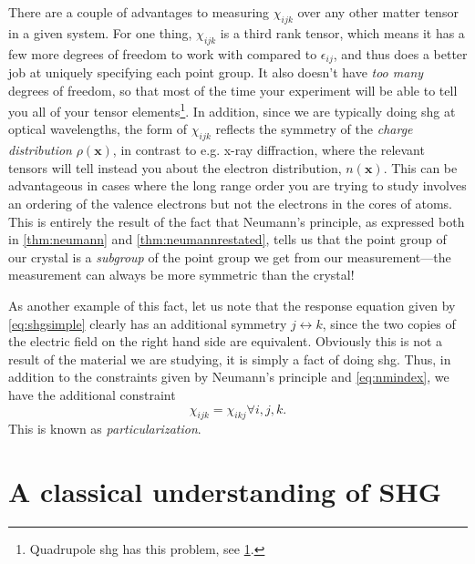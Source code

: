 There are a couple of advantages to measuring $\chi_{ijk}$ over any other matter tensor in a given system.
For one thing, $\chi_{ijk}$ is a third rank tensor, which means it has a few more degrees of freedom to work with compared to $\epsilon_{ij}$, and thus does a better job at uniquely specifying each point group.
It also doesn't have \emph{too many} degrees of freedom, so that most of the time your experiment will be able to tell you all of your tensor elements\footnote{Quadrupole \gls{shg} has this problem, see \cref{sec:manyshgterms}.}.
In addition, since we are typically doing \gls{shg} at optical wavelengths, the form of $\chi_{ijk}$ reflects the symmetry of the \emph{charge distribution} $\rho(\bm{x})$, in contrast to e.g. x-ray diffraction, where the relevant tensors will tell instead you about the electron distribution, $n(\bm{x})$.
This can be advantageous in cases where the long range order you are trying to study involves an ordering of the valence electrons but not the electrons in the cores of atoms.
This is entirely the result of the fact that Neumann's principle, as expressed both in \cref{thm:neumann} and \cref{thm:neumannrestated}, tells us that the point group of our crystal is a \emph{subgroup} of the point group we get from our measurement---the measurement can always be more symmetric than the crystal!

As another example of this fact, let us note that the response equation given by \cref{eq:shgsimple} clearly has an additional symmetry $j \leftrightarrow k$, since the two copies of the electric field on the right hand side are equivalent.
Obviously this is not a result of the material we are studying, it is simply a fact of doing \gls{shg}.
Thus, in addition to the constraints given by Neumann's principle and \cref{eq:nmindex}, we have the additional constraint
\begin{equation}
\chi_{ijk} = \chi_{ikj} \forall i,j,k.
\end{equation}
This is known as \emph{particularization}\citep{birss}.

\section{A classical understanding of SHG}\label{sec:manyshgterms}

